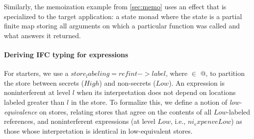 \documentclass[sigplan,screen]{acmart}\settopmatter{}
\newcommand{\comm}[3]{\ifcheckpagebudget\else\ifdraft{\maybecolor{#1}[#2: #3]}\fi\fi}
\newcommand{\ch}[1]{\comm{teal}{CH}{#1}}
\newcommand{\km}[1]{\comm{purple}{KM}{#1}}
\begin{document}

\iffull
Similarly, the memoization example from \autoref{sec:memo} uses an
effect that is specialized to the target application: a state monad
where the state is a partial finite map storing all arguments on which
a particular function was called and what answers it returned.

\fi




%
%


\paragraph*{Deriving IFC typing for expressions}
%
For starters, we use a \ls$store_labeling = ref int -> label$,
where \ls@label@ $\in$ @, to partition the store between
secrets (\ls$High$) and non-secrets (\ls$Low$).
%
An expression is noninterferent at level $l$ when its interpretation
does not depend on locations labeled greater than $l$ in the store.
%
To formalize this, we define a notion of \emph{low-equivalence} on
stores, relating stores that agree on the contents of
all \ls$Low$-labeled references, and noninterferent expressions (at
level \ls$Low$, i.e., \ls$ni_exp env e Low$) as those whose
interpretation is identical in low-equivalent stores.
\end{document}
